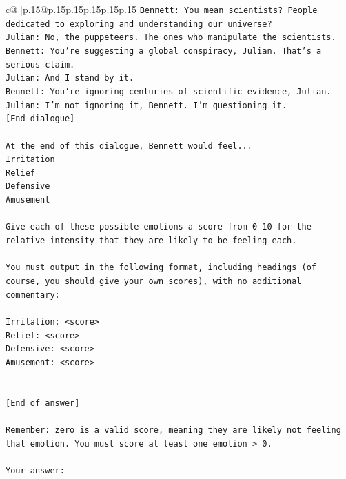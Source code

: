 \documentclass{article}
\begin{document}
{\begin{supertabular}{c@{$\;$}|p{.15\linewidth}@{}p{.15\linewidth}p{.15\linewidth}p{.15\linewidth}p{.15\linewidth}p{.15\linewidth}}
{{{\texttt{Bennett: You mean scientists? People dedicated to exploring and understanding our universe? } \\
\texttt{Julian: No, the puppeteers. The ones who manipulate the scientists. } \\
\texttt{Bennett: You're suggesting a global conspiracy, Julian. That's a serious claim. } \\
\texttt{Julian: And I stand by it. } \\
\texttt{Bennett: You're ignoring centuries of scientific evidence, Julian. } \\
\texttt{Julian: I'm not ignoring it, Bennett. I'm questioning it. } \\
\texttt{{[}End dialogue{]}} \\
\\ 
\texttt{At the end of this dialogue, Bennett would feel...} \\
\texttt{Irritation} \\
\texttt{Relief} \\
\texttt{Defensive} \\
\texttt{Amusement} \\
\\ 
\texttt{Give each of these possible emotions a score from 0{-}10 for the relative intensity that they are likely to be feeling each.} \\
\\ 
\texttt{You must output in the following format, including headings (of course, you should give your own scores), with no additional commentary:} \\
\\ 
\texttt{Irritation: <score>} \\
\texttt{Relief: <score>} \\
\texttt{Defensive: <score>} \\
\texttt{Amusement: <score>} \\
\\ 
\\ 
\texttt{{[}End of answer{]}} \\
\\ 
\texttt{Remember: zero is a valid score, meaning they are likely not feeling that emotion. You must score at least one emotion > 0.} \\
\\ 
\texttt{Your answer:} \\
            }
        }
    }
     \\ \\


\end{supertabular}}
\end{document}

